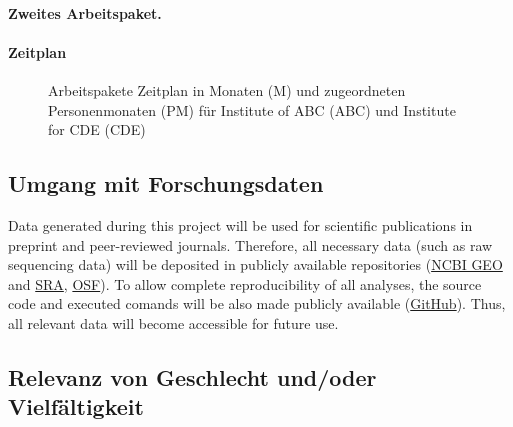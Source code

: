 \documentclass{scrartcl}
\begin{document}


\hrulefill
\paragraph{Zweites Arbeitspaket.}
\label{wp:2}





\let\theparagraph=\oldpara
\paragraph*{Zeitplan}
\vspace{-0.5cm}
\begin{figure}[h]
	\centering
  	\resizebox{\textwidth}{!}{}
	\caption{Arbeitspakete Zeitplan in Monaten (M) und zugeordneten Personenmonaten (PM) f\"ur Institute of ABC (ABC) und Institute for CDE (CDE)}
	\label{fig:timeline}
\end{figure}

\subsection{Umgang mit Forschungsdaten}
Data generated during this project will be used for scientific publications in
preprint and peer-reviewed journals. Therefore, all necessary data (such as raw
sequencing data) will be deposited in publicly available repositories
(\href{https://www.ncbi.nlm.nih.gov/geo/}{NCBI GEO} and
\href{https://www.ncbi.nlm.nih.gov/sra}{SRA}, \href{https://osf.io/}{OSF}). To
allow complete reproducibility of all analyses, the source code and executed
comands will be also made publicly available
(\href{https://github.com/}{GitHub}).  Thus, all relevant data will become
accessible for future use. 

\subsection{Relevanz von Geschlecht und/oder Vielfältigkeit}
\end{document}
